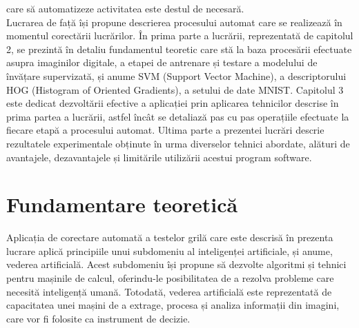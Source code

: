 \documentclass[a4paper,12pt]{report}
\newcommand\tab[1][1cm]{\hspace*{#1}}
\begin{document}
care să automatizeze activitatea este destul de necesară. 
\\ \tab Lucrarea de față își propune descrierea procesului automat care se realizează în momentul corectării lucrărilor. În prima parte a lucrării, reprezentată de capitolul 2, se prezintă în detaliu fundamentul teoretic care stă
la baza procesării efectuate asupra imaginilor digitale, a etapei de antrenare și testare a modelului de învățare supervizată, și anume SVM (Support Vector Machine), a descriptorului HOG (Histogram of Oriented Gradients),
a setului de date MNIST. Capitolul 3 este dedicat dezvoltării efective a aplicației prin aplicarea tehnicilor descrise în prima partea a lucrării, astfel încât se detaliază pas cu pas operațiile efectuate la fiecare etapă a procesului automat. Ultima parte a prezentei lucrări descrie rezultatele experimentale obținute în urma diverselor tehnici abordate, alături de avantajele, dezavantajele și limitările utilizării acestui program software.


\chapter*{}

\chapter {Fundamentare teoretică}
\tab Aplicația de corectare automată a testelor grilă care este descrisă în prezenta lucrare aplică principiile unui subdomeniu al inteligenței artificiale, și anume, vederea artificială. Acest subdomeniu își propune să dezvolte algoritmi și tehnici pentru mașinile de calcul, oferindu-le posibilitatea de a rezolva probleme care necesită inteligență umană. Totodată, vederea artificială este reprezentată de capacitatea unei mașini de a extrage, procesa și analiza informații din imagini, care vor fi folosite ca instrument de decizie.
\end{document}
